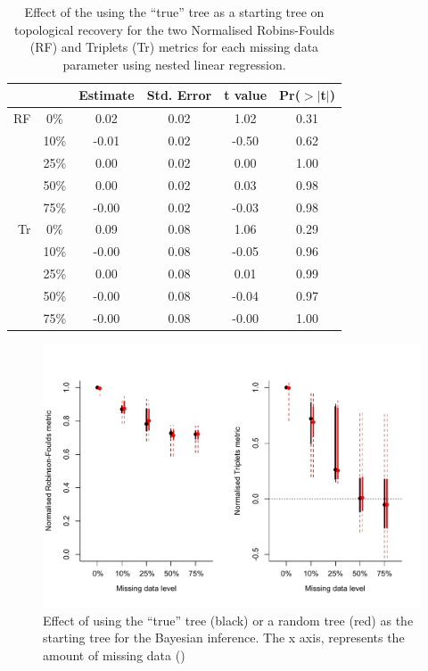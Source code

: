 \documentclass[12pt,letterpaper]{article}
\begin{document}
\begin{table}[ht]
\caption{Effect of the using the ``true'' tree as a starting tree on topological recovery for the two Normalised Robins-Foulds (RF) and Triplets (Tr) metrics for each missing data parameter using nested linear regression.}
\label{Tab_lmList_res}
\centering
\begin{tabular}{rccccc}
  \hline
 & & Estimate & Std. Error & t value & Pr($>$$|$t$|$) \\ 
  \hline
RF & 0\%  & 0.02 & 0.02 & 1.02 & 0.31 \\ 
   & 10\% & -0.01 & 0.02 & -0.50 & 0.62 \\ 
   & 25\% & 0.00 & 0.02 & 0.00 & 1.00 \\ 
   & 50\% & 0.00 & 0.02 & 0.03 & 0.98 \\ 
   & 75\% & -0.00 & 0.02 & -0.03 & 0.98 \\
Tr & 0\%  & 0.09 & 0.08 & 1.06 & 0.29 \\ 
   & 10\% & -0.00 & 0.08 & -0.05 & 0.96 \\ 
   & 25\% & 0.00 & 0.08 & 0.01 & 0.99 \\ 
   & 50\% & -0.00 & 0.08 & -0.04 & 0.97 \\ 
   & 75\% & -0.00 & 0.08 & -0.00 & 1.00 \\ 
   \hline
\end{tabular}
\end{table}

\begin{figure}
\centering
\includegraphics[keepaspectratio=true, width=\textwidth]{SupplementaryFigures/Starting_tree.pdf}
\caption{Effect of using the ``true'' tree (black) or a random tree (red) as the starting tree for the Bayesian inference. The x axis, represents the amount of missing data ()} %
\label{Fig_startingTree}
\end{figure}
\end{document}
